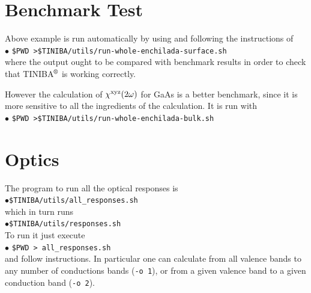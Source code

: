 \documentclass[12pt]{article}
\numberwithin{equation}{section}
\begin{document}
\section{Benchmark Test}

Above example is run automatically by using and following the
instructions of\\
$\bullet$ \verb=$PWD >$TINIBA/utils/run-whole-enchilada-surface.sh=\\
where the output ought to be compared with benchmark results in order
to check that TINIBA${\reg}$ is working correctly.

However the calculation of $\chi^{\mathrm{x}\mathrm{y}\mathrm{z}}(2\omega)$ for GaAs is a
better benchmark, since it is more sensitive to all the ingredients of
the calculation. It is run with\\
$\bullet$ \verb=$PWD >$TINIBA/utils/run-whole-enchilada-bulk.sh=\\

\section{Optics}
 
The program to run all the optical responses is\\
$\bullet$\verb=$TINIBA/utils/all_responses.sh=\\ 
which in turn runs\\
$\bullet$\verb=$TINIBA/utils/responses.sh=\\
To run it just execute\\
$\bullet$ \verb=$PWD > all_responses.sh= \\
and follow instructions. In particular one can calculate from all
valence bands to any number of conductions bands (\verb=-o 1=),
or from a given valence band to a given conduction band (\verb=-o 2=).
\end{document}
